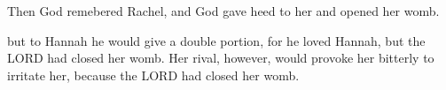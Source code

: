 \vspace{2\baselineskip}

\begin{scripture}[Genesis 30:22]
    Then God remebered Rachel, and God gave heed to her and opened her womb.
\end{scripture}

\vspace{2\baselineskip}

\begin{scripture}[1 Samuel 1:5-6]
    but to Hannah he would give a double portion, for he loved Hannah, but the LORD had closed her womb.
    Her rival, however, would provoke her bitterly to irritate her, because the LORD had closed her womb.
\end{scripture}

\vspace{2\baselineskip}

